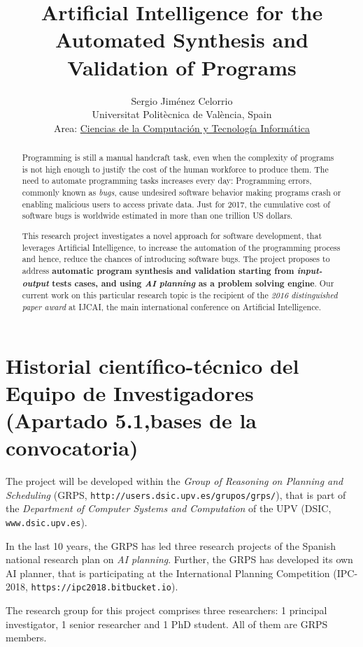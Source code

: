 \documentclass[10pt,a4paper]{paper}
\title{Artificial Intelligence for the Automated Synthesis and Validation of Programs}
\author{Sergio Jim\'enez Celorrio\\
\footnotesize Universitat Politècnica de València, Spain\\
\small Area: \underline{Ciencias de la Computación y Tecnología Informática}}
\begin{document}
\maketitle

\begin{abstract}
  Programming is still a manual handcraft task, even when the complexity of programs is not high enough to justify the cost of the human workforce to produce them. The need to automate programming tasks increases every day: Programming errors, commonly known as {\em bugs}, cause undesired software behavior making programs crash or enabling malicious users to access private data. Just for 2017, the cumulative cost of software bugs is worldwide estimated in more than one trillion US dollars. 

  This research project investigates a novel approach for software development, that leverages Artificial Intelligence, to increase the automation of the programming process and hence, reduce the chances of introducing software bugs. The project proposes to address {\bf automatic program synthesis and validation starting from {\em input-output} tests cases, and using {\em AI planning} as a problem solving engine}. Our current work on this particular research topic is the recipient of the {\em 2016 distinguished paper award} at {\sc IJCAI}, the main international conference on Artificial Intelligence.
\end{abstract}

\newpage

\section{Historial científico-técnico del Equipo de Investigadores (Apartado 5.1,bases de la convocatoria)}

The project will be developed within the {\em Group of Reasoning on Planning and Scheduling} (GRPS, {\tt http://users.dsic.upv.es/grupos/grps/}), that is part of the {\em Department of Computer Systems and Computation} of the UPV (DSIC, {\tt www.dsic.upv.es}).

In the last 10 years, the GRPS has led three research projects of the Spanish national research plan on {\em AI planning}. Further, the GRPS has developed its own AI planner, that is participating  at the International Planning Competition (IPC-2018, {\tt https://ipc2018.bitbucket.io}).

The research group for this project comprises three researchers: 1 principal investigator, 1 senior researcher and 1 PhD student. All of them are GRPS members. 
\end{document}
